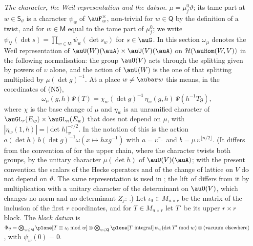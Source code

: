 \documentclass[10pt]{amsart}
\theoremstyle{definition}
\theoremstyle{remark}
\begin{document}
\emph{The character, the Weil representation and the datum.} $\mu=\mu_j^0\vartheta$; its tame
part at $w\in\mathsf S_\vartheta$ is a character $\psi_w$ of $\auF_w^\times$, non-trivial for
$w\in\mathsf Q$ by the definition of a twist, and for $w\in\mathsf M$ equal to the tame part of
$\mu_j^0$; we write $\psi_{\mathsf M}(\det s)=\prod_{w\in\mathsf M}\psi_w(\det s_w)$ for
$s\in\auG$. In this section $\omega_\mu$ denotes the Weil representation of
$\auU(W)(\auA)\times\auU(V)(\auA)$ on $\mathcal H(\auHom(W,V))$ in the following normalisation: the group $\auU(V)$ acts through the splitting given by
powers of $\upsilon$ alone, and the action of $\auU(W)$ is the one of that splitting multiplied by
$\mu(\det g)^{-1}$. At a place $w\ne\aubar w$ this means, in the coordinates of (N5),
\begin{equation}\label{po:eq-w5}
\omega_\mu(g,h)\Psi(T)=\chi_w(\det g)^{-1}\,\eta_w(g,h)\,\Psi(h^{-1}Tg),
\end{equation}
where $\chi$ is the base change of $\mu$ and $\eta_w$ is an unramified character of
$\auGL_r(E_w)\times\auGL_n(E_w)$ that does not depend on $\mu$, with $|\eta_w(1,h)|=|\det h|_w^{-r/2}$.
In the notation of {\cite[\S6.1.4]{P55}} this is the action $a(\det h)\,b(\det g)^{-1}\omega(x\mapsto
hxg^{-1})$ with $a=\upsilon^{r_-}$ and $b=\mu\,\upsilon^{\lfloor n/2\rfloor}$. (It differs from the
convention of {\cite[\S5.1.1]{P49}} for the upper chain, where the character twists both groups, by the
unitary character $\mu(\det h)$ of $\auU(V)(\auA)$; with the present convention the scalars of
the Hecke operators and of the change of lattice on $V$ do not depend on $\vartheta$. The same
representation is used in {\cite[\S6.1.4]{P55}}; the lift of {\cite[\S2.4]{P53}} differs from it by multiplication with a unitary character of the determinant on $\auU(V)$, which changes no norm and no determinant $Z_j$: {\cite[Remark~2.17]{P53}}.) Let
$\iota_0\in M_{n\times r}$ be the matrix of the inclusion of the first $r$ coordinates, and for
$T\in M_{n\times r}$ let $T'$ be its upper $r\times r$ block. The \emph{block datum} is
$\Phi_\vartheta=\bigotimes_{w\in\mathsf M}\plone[T\equiv\iota_0\bmod w]\otimes
\bigotimes_{w\in\mathsf Q}\plone[T\text{ integral}]\,\psi_w(\det T'\bmod w)\otimes(\text{vacuum
elsewhere})$, with $\psi_w(0)=0$.
\end{document}

